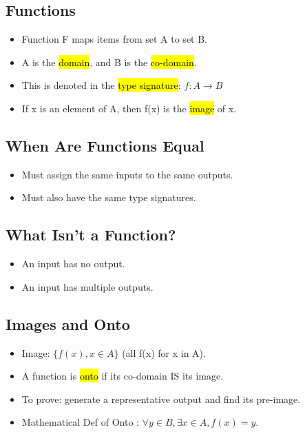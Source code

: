\subsection{Functions}
\begin{itemize}
    \item Function F maps items from set A to set B.
    \item A is the \hl{domain}, and B is the \hl{co-domain}.
    \item This is denoted in the \hl{type signature}: $f:A \rightarrow B$
    \item If x is an element of A, then f(x) is the \hl{image} of x.
\end{itemize}

\subsection{When Are Functions Equal}
\begin{itemize}
    \item Must assign the same inputs to the same outputs.
    \item Must also have the same type signatures.
\end{itemize}

\subsection{What Isn't a Function?}
\begin{itemize}
    \item An input has no output.
    \item An input has multiple outputs.
\end{itemize}

\subsection{Images and Onto}
\begin{itemize}
    \item Image: $\{f(x), x \in A\}$ (all f(x) for x in A).
    \item A function is \hl{onto} if its co-domain IS its image.
    \item To prove: generate a representative output and find its pre-image.
    \item Mathematical Def of Onto : $\forall y \in B, \exists x \in A, f(x) = y$.
\end{itemize}


